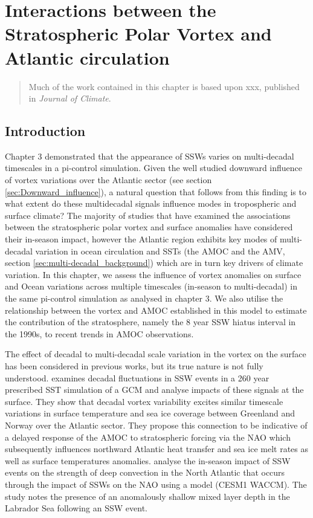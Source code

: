 \chapter{Interactions between the Stratospheric Polar Vortex and Atlantic circulation} 
\begin{quotation}
  Much of the work contained in this chapter is based upon xxx,
  published in \emph{Journal of Climate}.
\end{quotation}

\label{cha:surface}

\section{Introduction}
Chapter 3 demonstrated that the appearance of SSWs varies on multi-decadal timescales in a pi-control simulation. Given the well studied downward influence of vortex variations over the Atlantic sector (see section \ref{sec:Downward_influence}), a natural question that follows from this finding is to what extent do these multidecadal signals influence modes in tropospheric and surface climate? The majority of studies that have examined the associations between the stratospheric polar vortex and surface anomalies have considered their in-season impact, however the Atlantic region exhibits key modes of multi-decadal variation in ocean circulation and SSTs (the AMOC and the AMV, section \ref{sec:multi-decadal_background}) which are in turn key drivers of climate variation. In this chapter, we assess the influence of vortex anomalies on surface and Ocean variations across multiple timescales (in-season to multi-decadal)
in the same pi-control simulation as analysed in chapter 3. We also utilise the relationship between the vortex and AMOC established in this model to estimate the contribution of the stratosphere, namely the 8 year SSW hiatus interval in the 1990s, to recent trends in AMOC observations.

The effect of decadal to multi-decadal scale variation in the vortex on the surface has been considered in previous works, but its true nature is not fully understood. \cite{manziniStratospheretroposphere2012} examines decadal fluctuations in SSW events in a 260 year prescribed SST simulation of a GCM and analyse impacts of these signals at the surface. They show that decadal vortex variability excites similar timescale variations in surface temperature and sea ice coverage between Greenland and Norway over the Atlantic sector. They propose this connection to be indicative of a delayed response of the AMOC to stratospheric forcing via the NAO which  subsequently influences northward Atlantic heat transfer and sea ice melt rates as well as surface temperatures anomalies. \cite{haaseImportance2018} analyse the in-season impact of SSW events on the strength of deep convection in the North Atlantic that occurs through the impact of SSWs on the NAO using a model (CESM1 WACCM). The study notes the presence of an anomalously shallow  mixed layer depth in the Labrador Sea following an SSW event. 

